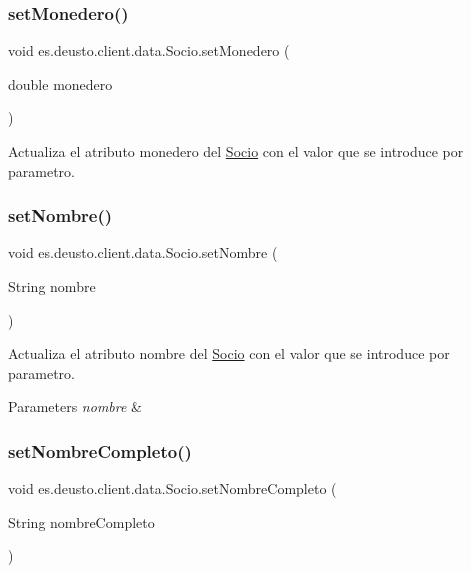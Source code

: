 \subsubsection{\texorpdfstring{setMonedero()}{setMonedero()}}
{\footnotesize\ttfamily void es.\+deusto.\+client.\+data.\+Socio.\+set\+Monedero (\begin{DoxyParamCaption}\item[{double}]{monedero }\end{DoxyParamCaption})}

Actualiza el atributo monedero del \mbox{\hyperlink{classes_1_1deusto_1_1client_1_1data_1_1_socio}{Socio}} con el valor que se introduce por parametro. \mbox{\label{classes_1_1deusto_1_1client_1_1data_1_1_socio_adbbc7a12f87235dc339a43cfe286e185}} 
\subsubsection{\texorpdfstring{setNombre()}{setNombre()}}
{\footnotesize\ttfamily void es.\+deusto.\+client.\+data.\+Socio.\+set\+Nombre (\begin{DoxyParamCaption}\item[{String}]{nombre }\end{DoxyParamCaption})}

Actualiza el atributo nombre del \mbox{\hyperlink{classes_1_1deusto_1_1client_1_1data_1_1_socio}{Socio}} con el valor que se introduce por parametro. 
\begin{DoxyParams}{Parameters}
{\em nombre} & \\
\hline
\end{DoxyParams}
\mbox{\label{classes_1_1deusto_1_1client_1_1data_1_1_socio_ac469151896eaa089ff0a3380eb1d410c}} 
\subsubsection{\texorpdfstring{setNombreCompleto()}{setNombreCompleto()}}
{\footnotesize\ttfamily void es.\+deusto.\+client.\+data.\+Socio.\+set\+Nombre\+Completo (\begin{DoxyParamCaption}\item[{String}]{nombre\+Completo }\end{DoxyParamCaption})}

